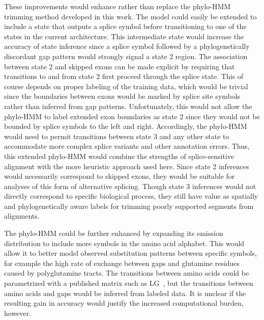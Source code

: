 These improvements would enhance rather than replace the phylo-HMM trimming method developed in this work. The model could easily be extended to include a state that outputs a splice symbol before transitioning to one of the states in the current architecture. This intermediate state would increase the accuracy of state inference since a splice symbol followed by a phylogenetically discordant gap pattern would strongly signal a state 2 region. The association between state 2 and skipped exons can be made explicit by requiring that transitions to and from state 2 first proceed through the splice state. This of course depends on proper labeling of the training data, which would be trivial since the boundaries between exons would be marked by splice site symbols rather than inferred from gap patterns. Unfortunately, this would not allow the phylo-HMM to label extended exon boundaries as state 2 since they would not be bounded by splice symbols to the left and right. Accordingly, the phylo-HMM would need to permit transitions between state 3 and any other state to accommodate more complex splice variants and other annotation errors. Thus, this extended phylo-HMM would combine the strengths of splice-sensitive alignment with the more heuristic approach used here. Since state 2 inferences would necessarily correspond to skipped exons, they would be suitable for analyses of this form of alternative splicing. Though state 3 inferences would not directly correspond to specific biological process, they still have value as spatially and phylogenetically aware labels for trimming poorly supported segments from alignments.

The phylo-HMM could be further enhanced by expanding its emission distribution to include more symbols in the amino acid alphabet. This would allow it to better model observed substitution patterns between specific symbols, for example the high rate of exchange between gaps and glutamine residues caused by polyglutamine tracts. The transitions between amino acids could be parametrized with a published matrix such as LG~\cite{Le2008}, but the transitions between amino acids and gaps would be inferred from labeled data. It is unclear if the resulting gain in accuracy would justify the increased computational burden, however.

